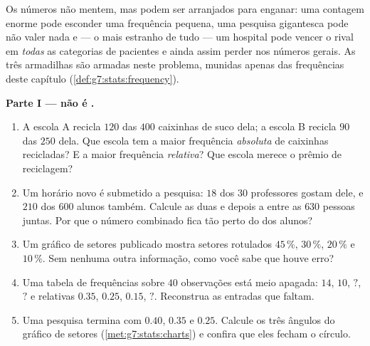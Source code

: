 \begin{problem}
\label{pb:g7:stats:1}
Os números não mentem, mas podem ser arranjados para enganar: uma
contagem enorme pode esconder uma frequência pequena, uma pesquisa
gigantesca pode não valer nada e --- o mais estranho de tudo --- um
hospital pode vencer o rival em \emph{todas} as categorias de pacientes
e ainda assim perder nos números gerais. As três armadilhas são armadas
neste problema, munidas apenas das frequências deste capítulo
(\cref{def:g7:stats:frequency}).

\medskip
\noindent\textbf{Parte I ---  não é .}
\begin{enumerate}
  \item A escola A recicla $120$ das $400$ caixinhas de suco dela; a
        escola B recicla $90$ das $250$ dela. Que escola tem a maior
        frequência \emph{absoluta} de caixinhas recicladas? E a maior
        frequência \emph{relativa}? Que escola merece o prêmio de
        reciclagem?
  \item Um horário novo é submetido a pesquisa: $18$ dos $30$
        professores gostam dele, e $210$ dos $600$ alunos também.
        Calcule as duas  e depois a  entre as $630$ pessoas juntas. Por que o número
        combinado fica tão perto do dos alunos?
  \item Um gráfico de setores publicado mostra setores rotulados
        $45\,\%$, $30\,\%$, $20\,\%$ e $10\,\%$. Sem nenhuma outra
        informação, como você sabe que houve erro?
  \item Uma tabela de frequências sobre $40$ observações está meio
        apagada:  $14$, $10$, $?$, $?$ e
        relativas $0.35$, $0.25$, $0.15$, $?$. Reconstrua as entradas
        que faltam.
  \item Uma pesquisa termina com  $0.40$, $0.35$ e
        $0.25$. Calcule os três ângulos do gráfico de setores
        (\cref{met:g7:stats:charts}) e confira que eles fecham o
        círculo.
\end{enumerate}


\end{problem}
